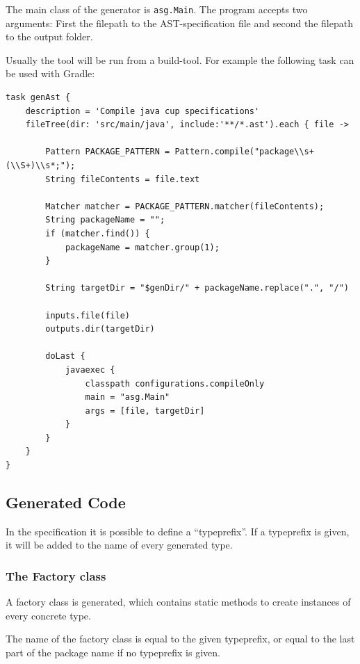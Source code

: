 \documentclass{scrartcl}
\begin{document}
The main class of the generator is \lstinline!asg.Main!.
The program accepts two arguments: First the filepath to the AST-specification file and second the filepath to the output folder.

Usually the tool will be run from a build-tool.
For example the following task can be used with Gradle:

\begin{lstlisting}
task genAst {
    description = 'Compile java cup specifications'
    fileTree(dir: 'src/main/java', include:'**/*.ast').each { file ->

        Pattern PACKAGE_PATTERN = Pattern.compile("package\\s+(\\S+)\\s*;");
        String fileContents = file.text

        Matcher matcher = PACKAGE_PATTERN.matcher(fileContents);
        String packageName = "";
        if (matcher.find()) {
            packageName = matcher.group(1);
        }

        String targetDir = "$genDir/" + packageName.replace(".", "/")

        inputs.file(file)
        outputs.dir(targetDir)

        doLast {
            javaexec {
                classpath configurations.compileOnly
                main = "asg.Main"
                args = [file, targetDir]
            }
        }
    }
}
\end{lstlisting}




\subsection{Generated Code}

In the specification it is possible to define a ``typeprefix''.
If a typeprefix is given, it will be added to the name of every generated type.


\subsubsection{The Factory class}
\label{Factory}

A factory class is generated, which contains static methods to create instances of every concrete type.

The name of the factory class is equal to the given typeprefix, or equal to the last part of the package name if no typeprefix is given.
\end{document}
